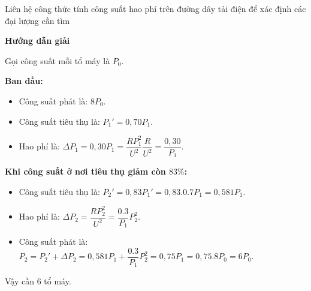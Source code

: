 \begin{dang}{Liên hệ công thức tính công suất hao phí trên đường dây tải điện để xác định các đại lượng cần tìm}
	
	{\begin{center}
			\textbf{Hướng dẫn giải}
		\end{center}
		
		Gọi công suất mỗi tổ máy là ${{P}_{0}}$.
		
		\textbf{Ban đầu:}
		\begin{itemize}
			\item Công suất phát là: $8{{P}_{0}}$.
			\item Công suất tiêu thụ là: ${{P}_{1}}'=0,70{{P}_{1}}$.
			\item Hao phí là:
			$\Delta {{P}_{1}}=0,30{{P}_{1}}=\dfrac{RP_{1}^{2}}{{{U}^{2}}} \dfrac{R}{{{U}^{2}}}=\dfrac{0,30}{{{P}_{1}}}$.
		\end{itemize}
		
		\textbf{Khi công suất ở nơi tiêu thụ giảm còn $83\%$:}
		\begin{itemize}
			\item Công suất tiêu thụ là: ${{P}_{2}}'=0,83{{P}_{1}}'=0,83.0.7{{P}_{1}}=0,581{{P}_{1}}$.	
			\item Hao phí là: $\Delta {{P}_{2}}=\dfrac{RP_{2}^{2}}{{{U}^{2}}}=\dfrac{0.3}{{{P}_{1}}}P_{2}^{2}$.		
			\item Công suất phát là: ${{P}_{2}}={{P}_{2}}'+\Delta {{P}_{2}}=0,581{{P}_{1}}+\dfrac{0.3}{{{P}_{1}}}P_{2}^{2}=0,75{{P}_{1}}=0,75.8{{P}_{0}}=6{{P}_{0}}$.
		\end{itemize}
		
		Vậy cần $6$ tổ máy.
		
}
\end{dang}
